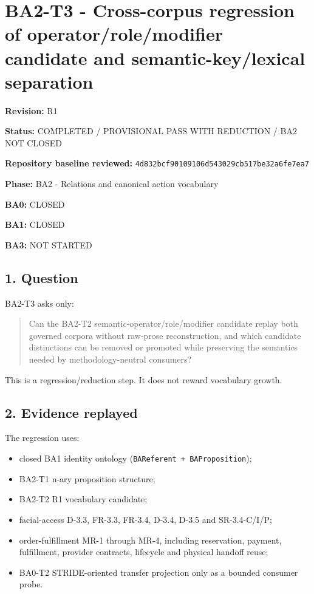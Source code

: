 \documentclass[
  10pt,
  a4paper,
]{article}
\author{}
\date{}
\providecommand{\tightlist}{%
  \setlength{\itemsep}{0pt}\setlength{\parskip}{0pt}}
\begin{document}
\section{BA2-T3 - Cross-corpus regression of operator/role/modifier
candidate and semantic-key/lexical
separation}\label{ba2-t3---cross-corpus-regression-of-operatorrolemodifier-candidate-and-semantic-keylexical-separation}

\textbf{Revision:} R1

\textbf{Status:} COMPLETED / PROVISIONAL PASS WITH REDUCTION / BA2 NOT
CLOSED

\textbf{Repository baseline reviewed:}
\texttt{4d832bcf90109106d543029cb517be32a6fe7ea7}

\textbf{Phase:} BA2 - Relations and canonical action vocabulary

\textbf{BA0:} CLOSED

\textbf{BA1:} CLOSED

\textbf{BA3:} NOT STARTED

\subsection{1. Question}\label{1-question}

BA2-T3 asks only:

\begin{quote}
Can the BA2-T2 semantic-operator/role/modifier candidate replay both
governed corpora without raw-prose reconstruction, and which candidate
distinctions can be removed or promoted while preserving the semantics
needed by methodology-neutral consumers?
\end{quote}

This is a regression/reduction step. It does not reward vocabulary
growth.

\subsection{2. Evidence replayed}\label{2-evidence-replayed}

The regression uses:

\begin{itemize}
\tightlist
\item
  closed BA1 identity ontology (\texttt{BAReferent\ +\ BAProposition});
\item
  BA2-T1 n-ary proposition structure;
\item
  BA2-T2 R1 vocabulary candidate;
\item
  facial-access D-3.3, FR-3.3, FR-3.4, D-3.4, D-3.5 and SR-3.4-C/I/P;
\item
  order-fulfillment MR-1 through MR-4, including reservation, payment,
  fulfillment, provider contracts, lifecycle and physical handoff reuse;
\item
  BA0-T2 STRIDE-oriented transfer projection only as a bounded consumer
  probe.
\end{itemize}
\end{document}

